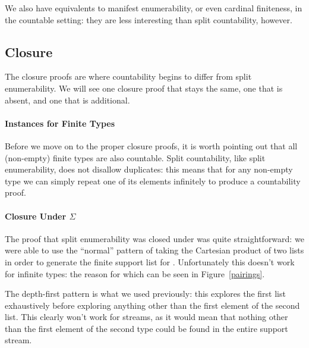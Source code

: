We also have equivalents to manifest enumerability, or even cardinal finiteness,
in the countable setting: they are less interesting than split countability,
however.
\subsection{Closure}
The closure proofs are where countability begins to differ from split
enumerability.
We will see one closure proof that stays the same, one that is absent, and one
that is additional.
\paragraph{Instances for Finite Types}
Before we move on to the proper closure proofs, it is worth pointing out that
all (non-empty) finite types are also countable.
Split countability, like split enumerability, does not disallow duplicates: this
means that for any non-empty type we can simply repeat one of its elements
infinitely to produce a countability proof.
\paragraph{Closure Under \(\Sigma\)}
The proof that split enumerability was closed under \AgdaDatatype{\(\Sigma\)}
was quite straightforward:
we were able to use the ``normal'' pattern of taking the Cartesian product of
two lists in order to generate the finite support list for
\AgdaDatatype{\(\Sigma\)}.
Unfortunately this doesn't work for infinite types: the reason for which can be
seen in Figure~\ref{pairings}.




The depth-first pattern is what we used previously: this explores the first list
exhaustively before exploring anything other than the first element of the
second list.
This clearly won't work for streams, as it would mean that nothing other than
the first element of the second type could be found in the entire support
stream.

